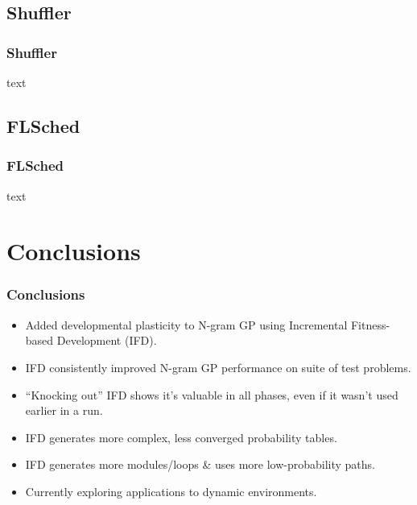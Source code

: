 \documentclass{beamer}
\newcommand{\linespace}{\vskip 0.25cm}
\begin{document}
\subsection{Shuffler}
\begin{frame}
\frametitle{Shuffler}

text

\end{frame}

\subsection{FLSched}
\begin{frame}
\frametitle{FLSched}

text

\end{frame}

\section[Conclusions]{Conclusions}

\begin{frame}
\frametitle{Conclusions}

\begin{itemize}
  \item Added developmental plasticity to N-gram GP using Incremental Fitness-based Development (IFD).
\end{itemize}

\begin{itemize}
  \item IFD consistently improved N-gram GP performance on suite of test problems.
  
  \linespace
  
  \item ``Knocking out'' IFD shows it's valuable in all phases, even if it wasn't used earlier in a run.

  \linespace
  
  \item IFD generates more complex, less converged probability tables.
  \item IFD generates more modules/loops \& uses more low-probability paths.
\end{itemize}

\begin{itemize}
  \item Currently exploring applications to dynamic environments.
\end{itemize}

\end{frame}
\end{document}
